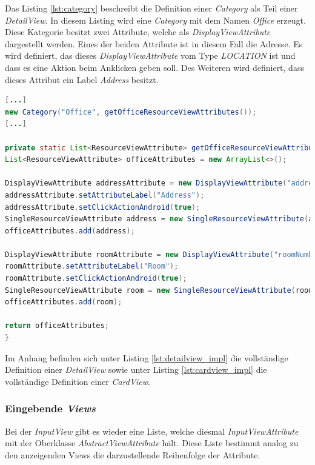 Das Listing \ref{lst:category} beschreibt die Definition einer \textit{Category} als Teil einer \textit{DetailView}. In diesem Listing wird eine \textit{Category} mit dem Namen \textit{Office} erzeugt. Diese Kategorie besitzt zwei Attribute, welche als \textit{DisplayViewAttribute} dargestellt werden. Eines der beiden Attribute ist in diesem Fall die Adresse. Es wird definiert, das dieses \textit{DisplayViewAttribute} vom Type \textit{LOCATION} ist und dass es eine Aktion beim Anklicken geben soll. Des Weiteren wird definiert, dass dieses Attribut ein Label \textit{Address} besitzt.

\begin{lstlisting}[label=lst:category,
language=java,
firstnumber=1,
caption=Erstellung einer \textit{Category}.]		
[...]
new Category("Office", getOfficeResourceViewAttributes());
[...]

private static List<ResourceViewAttribute> getOfficeResourceViewAttributes() {
List<ResourceViewAttribute> officeAttributes = new ArrayList<>();

DisplayViewAttribute addressAttribute = new DisplayViewAttribute("address", ViewAttribute.AttributeType.LOCATION);
addressAttribute.setAttributeLabel("Address");
addressAttribute.setClickActionAndroid(true);
SingleResourceViewAttribute address = new SingleResourceViewAttribute(addressAttribute);
officeAttributes.add(address);

DisplayViewAttribute roomAttribute = new DisplayViewAttribute("roomNumber", ViewAttribute.AttributeType.TEXT);
roomAttribute.setAttributeLabel("Room");
roomAttribute.setClickActionAndroid(true);
SingleResourceViewAttribute room = new SingleResourceViewAttribute(roomAttribute);
officeAttributes.add(room);

return officeAttributes;
}
\end{lstlisting}

Im Anhang befinden sich unter Listing \ref{lst:detailview_impl} die vollständige Definition einer \textit{DetailView} sowie unter Listing \ref{lst:cardview_impl} die vollständige Definition einer \textit{CardView}. 

\subsubsection{Eingebende \textit{Views}}

Bei der \textit{InputView} gibt es wieder eine Liste, welche diesmal \textit{InputViewAttribute} mit der Oberklasse \textit{AbstractViewAttribute} hält. Diese Liste bestimmt analog zu den anzeigenden Views die darzustellende Reihenfolge der Attribute. 

